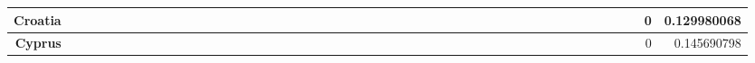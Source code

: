 \documentclass[a4paper,11pt]{report}
\begin{document}
\begin{appendices}
\begin{landscape}
\begin{longtable}{r|r|r|r|r|r|r|r|r|r|r|r|r|r|r|r|r|r|r|r|r|r|r|r|r|r|r|r|r|r|r|r|r|r|r|r|r|r|r|r|r|r|r|r|r|r|r|r|}
\multicolumn{1}{|r|}{\textbf{Croatia}}               &                  &                  &                  &                     &                  &                  &                                &                   &                  &                 &                  &                  &                           &                  &                 &                  &                  &                 &                  &                  &                  &                 &                &                 &                    &                &                  &                 &                 &                   &                  &                 &                     &                 &                   &                   &                &                 &                      &                          &                 &                  &                         &                 &                & 0                        & 0.129980068        \\ \hline
\multicolumn{1}{|r|}{\textbf{Cyprus}}                &                  &                  &                  &                     &                  &                  &                                &                   &                  &                 &                  &                  &                           &                  &                 &                  &                  &                 &                  &                  &                  &                 &                &                 &                    &                &                  &                 &                 &                   &                  &                 &                     &                 &                   &                   &                &                 &                      &                          &                 &                  &                         &                 &                & 0                        & 0.145690798        \\ \hline

\end{longtable}
\end{landscape}
\end{appendices}
\end{document}
